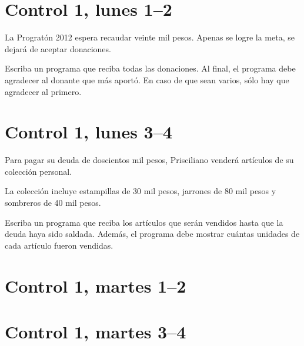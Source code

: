 \documentclass[12pt,spanish,a5paper,landscape]{article}
\begin{document}
  \pagestyle{empty}
  \thispagestyle{empty}

  \part*{Control 1, lunes 1--2}
  \newpage

  La Progratón 2012 espera recaudar veinte mil pesos.
  Apenas se logre la meta,
  se dejará de aceptar donaciones.

  Escriba un programa que reciba todas las donaciones.
  Al final,
  el programa debe agradecer
  al donante que más aportó.
  En caso de que sean varios,
  sólo hay que agradecer al primero.

  

  \newpage
  \part*{Control 1, lunes 3--4}
  \newpage

  Para pagar su deuda de doscientos mil pesos,
  Prisciliano venderá artículos de su colección personal.

  La colección incluye
  estampillas de 30 mil pesos,
  jarrones de 80 mil pesos y
  sombreros de 40 mil pesos.

  Escriba un programa
  que reciba los artículos que serán vendidos
  hasta que la deuda haya sido saldada.
  Además,
  el programa debe mostrar
  cuántas unidades de cada artículo
  fueron vendidas.

  



  \newpage
  \part*{Control 1, martes 1--2}
  \newpage


  \newpage
  \part*{Control 1, martes 3--4}
  \newpage
\end{document}
